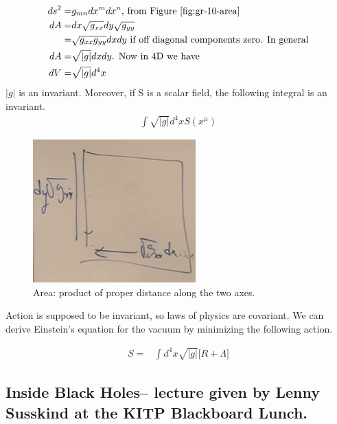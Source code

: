 \documentclass[]{article}
\begin{document}
{\begin{align*}
	ds^2 =& g_{mn} dx^m dx^n \text{, from Figure \ref{fig:gr-10-area}}\\
	dA =& dx\sqrt{g_{xx}} dy \sqrt{g_{yy}}\\
	=& \sqrt{g_{xx} g_{yy}} dx dy \text{ if off diagonal components zero. In general}\\
	dA =& \sqrt{\lvert g \rvert} dx dy	\text{. Now in 4D we have}\\
	dV =& \sqrt{\lvert g \rvert} d^4x
\end{align*}
$\lvert g \rvert$ is an invariant. Moreover, if S is a scalar field, the following integral is an invariant.
\begin{align*}
	\int \sqrt{\lvert g \rvert} d^4x S(x^\mu)
\end{align*}

\begin{figure}[H]
	\begin{center}
		\caption{Area: product of proper distance along the two axes.}\label{fig:gr-10-area}
		\includegraphics{gr-10-area}
	\end{center}
\end{figure}

Action is supposed to be invariant, so laws of physics are covariant. We can derive Einstein's equation for the vacuum by minimizing the following action.

\begin{align*}
	S=&\int d^4x \sqrt{\lvert g \rvert} \big[R + \Lambda\big]
\end{align*}

\begin{appendices}
	\section{Inside Black Holes-- lecture given by Lenny Susskind at the KITP Blackboard Lunch.}\label{app:inh}
	

\end{appendices}}
\end{document}
